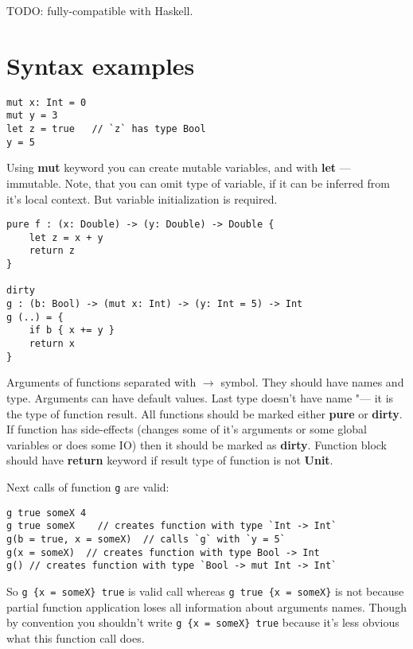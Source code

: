 \documentclass[a4paper]{article}
\begin{document}
TODO: fully-compatible with Haskell.

\section*{Syntax examples}

\begin{lstlisting}[caption=Variables declaration]
mut x: Int = 0
mut y = 3
let z = true   // `z` has type Bool
y = 5
\end{lstlisting}

Using \textbf{mut} keyword you can create mutable variables, and with \textbf{let} --- immutable. Note, that you can omit type of variable, if it can be inferred from it's local context. But variable initialization is required.

\begin{lstlisting}[caption=Function declaration]
pure f : (x: Double) -> (y: Double) -> Double {
    let z = x + y
    return z
}

dirty 
g : (b: Bool) -> (mut x: Int) -> (y: Int = 5) -> Int 
g (..) = {
    if b { x += y }
    return x
}
\end{lstlisting}

Arguments of functions separated with $\rightarrow$ symbol. They should have names and type. Arguments can have default values. Last type doesn't have name "--- it is the type of function result. All functions should be marked either \textbf{pure} or \textbf{dirty}. If function has side-effects (changes some of it's arguments or some global variables or does some IO) then it should be marked as \textbf{dirty}. Function block should have \textbf{return} keyword if result type of function is not \textbf{Unit}.

Next calls of function \texttt{g} are valid:

\begin{lstlisting}[caption=Function calls]
g true someX 4 
g true someX    // creates function with type `Int -> Int`
g(b = true, x = someX)  // calls `g` with `y = 5`
g(x = someX)  // creates function with type Bool -> Int
g() // creates function with type `Bool -> mut Int -> Int`
\end{lstlisting}

So \texttt{g \{x = someX\} true} is valid call whereas \texttt{g true \{x = someX\}} is not
because partial function application loses all information about arguments names. Though by convention you shouldn't write \texttt{g \{x = someX\} true} because it's less obvious what this function call does.
\end{document}
